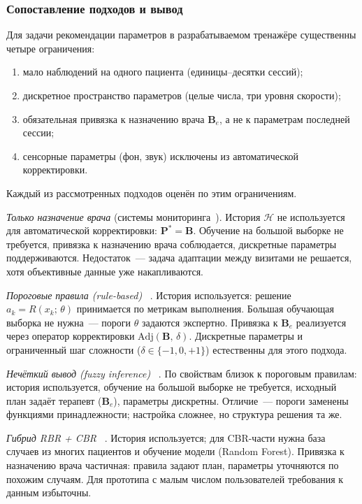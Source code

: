 \subsubsection{Сопоставление подходов и вывод}

Для задачи рекомендации параметров в разрабатываемом тренажёре
существенны четыре ограничения:
\begin{enumerate}
    \item мало наблюдений на одного пациента (единицы--десятки сессий);
    \item дискретное пространство параметров (целые числа, три уровня
    скорости);
    \item обязательная привязка к назначению врача $\mathbf{B}_e$,
    а не к параметрам последней сессии;
    \item сенсорные параметры (фон, звук) исключены из автоматической
    корректировки.
\end{enumerate}

Каждый из рассмотренных подходов оценён по этим ограничениям.

\textit{Только назначение врача}
(системы мониторинга~\cite{hovareshti2021,meldrum2022}).
История $\mathcal{H}$ не используется для автоматической корректировки:
$\mathbf{P}^{*} = \mathbf{B}$. Обучение на большой выборке не требуется,
привязка к назначению врача соблюдается, дискретные параметры
поддерживаются. Недостаток~--- задача адаптации между визитами
не решается, хотя объективные данные уже накапливаются.

\textit{Пороговые правила (rule-based)}
~\cite{noble2021,rule10,emg2020}.
История используется: решение $a_k = R(x_k;\,\theta)$ принимается по
метрикам выполнения. Большая обучающая выборка не нужна~--- пороги
$\theta$ задаются экспертно. Привязка к $\mathbf{B}_e$ реализуется
через оператор корректировки $\mathrm{Adj}(\mathbf{B},\,\delta)$.
Дискретные параметры и ограниченный шаг сложности ($\delta \in \{-1,0,+1\}$)
естественны для этого подхода.

\textit{Нечёткий вывод (fuzzy inference)}
~\cite{gomez2021,castro2023}.
По свойствам близок к пороговым правилам: история используется,
обучение на большой выборке не требуется, исходный план задаёт
терапевт ($\mathbf{B}_e$), параметры дискретны. Отличие~--- пороги
заменены функциями принадлежности; настройка сложнее, но структура
решения та же.

\textit{Гибрид RBR + CBR}
~\cite{zhou2024}.
История используется; для CBR-части нужна база случаев из многих
пациентов и обучение модели (Random Forest). Привязка к назначению
врача частичная: правила задают план, параметры уточняются по
похожим случаям. Для прототипа с малым числом пользователей
требования к данным избыточны.


